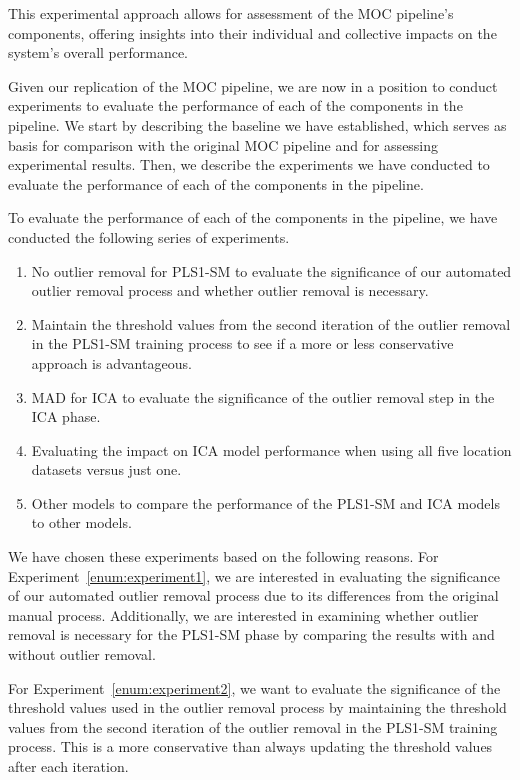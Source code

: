 This experimental approach allows for assessment of the MOC pipeline's components, offering insights into their individual and collective impacts on the system's overall performance.


Given our replication of the MOC pipeline, we are now in a position to conduct experiments to evaluate the performance of each of the components in the pipeline.
We start by describing the baseline we have established, which serves as basis for comparison with the original MOC pipeline and for assessing experimental results.
Then, we describe the experiments we have conducted to evaluate the performance of each of the components in the pipeline.

To evaluate the performance of each of the components in the pipeline, we have conducted the following series of experiments.

\begin{enumerate}
	\item\label{enum:experiment1} No outlier removal for PLS1-SM to evaluate the significance of our automated outlier removal process and whether outlier removal is necessary.
	\item\label{enum:experiment2} Maintain the threshold values from the second iteration of the outlier removal in the PLS1-SM training process to see if a more or less conservative approach is advantageous.
	\item\label{enum:experiment3} MAD for ICA to evaluate the significance of the outlier removal step in the ICA phase.
	\item\label{enum:experiment4} Evaluating the impact on ICA model performance when using all five location datasets versus just one.
	\item\label{enum:experiment5} Other models to compare the performance of the PLS1-SM and ICA models to other models.
\end{enumerate}

\noindent
We have chosen these experiments based on the following reasons.
For Experiment~\ref{enum:experiment1}, we are interested in evaluating the significance of our automated outlier removal process due to its differences from the original manual process.
Additionally, we are interested in examining whether outlier removal is necessary for the PLS1-SM phase by comparing the results with and without outlier removal.

For Experiment~\ref{enum:experiment2}, we want to evaluate the significance of the threshold values used in the outlier removal process by maintaining the threshold values from the second iteration of the outlier removal in the PLS1-SM training process.
This is a more conservative than always updating the threshold values after each iteration.

